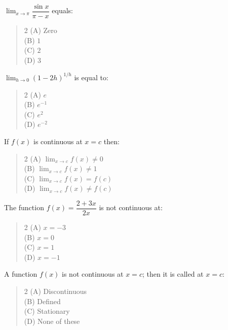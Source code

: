 \documentclass[11pt,a4paper]{article}
\begin{document}
\begin{mcqlist}
\item $\displaystyle\lim_{x\to\pi}\dfrac{\sin x}{\pi-x}$ equals:
\begin{quote}\begin{multicols}{2}
\noindent (A) Zero \\
(B) $1$ \\
(C) $2$ \\
(D) $3$
\end{multicols}\end{quote}

\item $\displaystyle\lim_{h\to0}(1-2h)^{1/h}$ is equal to:
\begin{quote}\begin{multicols}{2}
\noindent (A) $e$ \\
(B) $e^{-1}$ \\
(C) $e^2$ \\
(D) $e^{-2}$
\end{multicols}\end{quote}

\item If $f(x)$ is continuous at $x=c$ then:
\begin{quote}\begin{multicols}{2}
\noindent (A) $\displaystyle\lim_{x\to c}f(x)\neq0$ \\
(B) $\displaystyle\lim_{x\to c}f(x)\neq1$ \\
(C) $\displaystyle\lim_{x\to c}f(x)=f(c)$ \\
(D) $\displaystyle\lim_{x\to c}f(x)\neq f(c)$
\end{multicols}\end{quote}

\item The function $f(x)=\dfrac{2+3x}{2x}$ is not continuous at:
\begin{quote}\begin{multicols}{2}
\noindent (A) $x=-3$ \\
(B) $x=0$ \\
(C) $x=1$ \\
(D) $x=-1$
\end{multicols}\end{quote}

\item A function $f(x)$ is not continuous at $x=c$; then it is called \underline{\hspace{1.5cm}} at $x=c$:
\begin{quote}\begin{multicols}{2}
\noindent (A) Discontinuous \\
(B) Defined \\
(C) Stationary \\
(D) None of these
\end{multicols}\end{quote}


\end{mcqlist}
\end{document}
